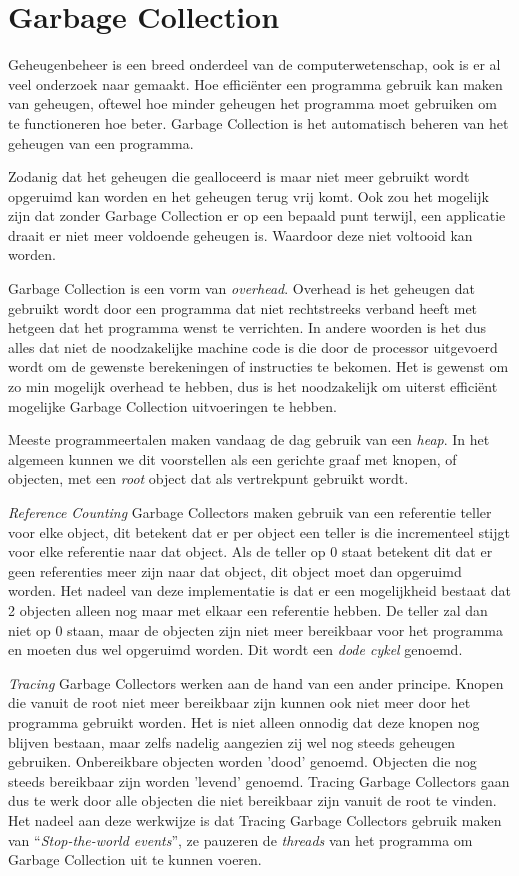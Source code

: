 \section{Garbage Collection}
\label{sec:Garbage collection}
Geheugenbeheer is een breed onderdeel van de computerwetenschap, ook is er al veel onderzoek naar gemaakt.
Hoe efficiënter een programma gebruik kan maken van geheugen, oftewel hoe minder geheugen het programma moet gebruiken om te functioneren hoe beter.
Garbage Collection is het automatisch beheren van het geheugen van een programma.


Zodanig dat het geheugen die gealloceerd is maar niet meer gebruikt wordt opgeruimd kan worden en het geheugen terug vrij komt.
Ook zou het mogelijk zijn dat zonder Garbage Collection er op een bepaald punt terwijl, een applicatie draait er niet meer voldoende geheugen is. Waardoor deze niet voltooid kan worden.


Garbage Collection is een vorm van \textit{overhead}.
Overhead is het geheugen dat gebruikt wordt door een programma dat niet rechtstreeks verband heeft met hetgeen dat het programma wenst te verrichten.
In andere woorden is het dus alles dat niet de noodzakelijke machine code is die door de processor uitgevoerd wordt om de gewenste berekeningen of instructies te bekomen.
Het is gewenst om zo min mogelijk overhead te hebben, dus is het noodzakelijk om uiterst efficiënt mogelijke Garbage Collection uitvoeringen te hebben.


Meeste programmeertalen maken vandaag de dag gebruik van een \textit{heap}.
In het algemeen kunnen we dit voorstellen als een gerichte graaf met knopen, of objecten, met een \textit{root} object dat als vertrekpunt gebruikt wordt.


\textit{Reference Counting} Garbage Collectors maken gebruik van een referentie teller voor elke object, dit betekent dat er per object een teller is die incrementeel stijgt voor elke referentie naar dat object.
Als de teller op 0 staat betekent dit dat er geen referenties meer zijn naar dat object, dit object moet dan  opgeruimd worden.
Het nadeel van deze implementatie is dat er een mogelijkheid bestaat dat 2 objecten alleen nog maar met elkaar een referentie hebben.
De teller zal dan niet op 0 staan, maar de objecten zijn niet meer bereikbaar voor het programma en moeten dus wel opgeruimd worden.
Dit wordt een \textit{dode cykel} genoemd.\autocite{VanderCruysse2019}

\textit{Tracing} Garbage Collectors werken aan de hand van een ander principe.
Knopen die vanuit de root niet meer bereikbaar zijn kunnen ook niet meer door het programma gebruikt worden.
Het is niet alleen onnodig dat deze knopen nog blijven bestaan, maar zelfs nadelig aangezien zij wel nog steeds geheugen gebruiken.
Onbereikbare objecten worden 'dood' genoemd.
Objecten die nog steeds bereikbaar zijn worden 'levend' genoemd.
Tracing Garbage Collectors gaan dus te werk door alle objecten die niet bereikbaar zijn vanuit de root te vinden. 
Het nadeel aan deze werkwijze is dat Tracing Garbage Collectors gebruik maken van ``\textit{Stop-the-world events}'', ze pauzeren de \textit{threads} van het programma om Garbage Collection uit te kunnen voeren.

